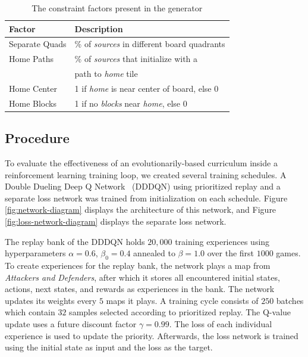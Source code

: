 \documentclass[letterpaper]{article} %
\begin{document}
\begin{table}[tpb]
\begin{tabular}{|l|l|}
\hline
\textbf{Factor} & \textbf{Description}                                       \\ \hline
Separate Quads  & \% of \textit{sources} in different board quadrants               \\ \hline
Home Paths      & \% of \textit{sources} that initialize with a\\ & path to \textit{home} tile          \\ \hline
Home Center     & 1 if \textit{home} is near center of board, else 0                  \\ \hline
Home Blocks     & 1 if no \textit{blocks} near \textit{home}, else 0 \\ \hline
\end{tabular}
\caption{The constraint factors present in the generator}
\label{table:constraint-factors}
\end{table}

\subsection{Procedure}\label{sec:case-procedure}
To evaluate the effectiveness of an evolutionarily-based curriculum inside a reinforcement learning training loop, we created several training schedules. A Double Dueling Deep Q Network~\cite{wang2016dueling} (DDDQN) using prioritized replay and a separate loss network was trained from initialization on each schedule. Figure \ref{fig:network-diagram} displays the architecture of this network, and Figure \ref{fig:loss-network-diagram} displays the separate loss network.

The replay bank of the DDDQN holds $20,000$ training experiences using hyperparameters $\alpha=0.6$, $\beta_{0}=0.4$ annealed to $\beta=1.0$ over the first $1000$ games. To create experiences for the replay bank, the network plays a map from \emph{Attackers and Defenders}, after which it stores all encountered initial states, actions, next states, and rewards as experiences in the bank. The network updates its weights every $5$ maps it plays. A training cycle consists of $250$ batches which contain $32$ samples selected according to prioritized replay. The Q-value update uses a future discount factor $\gamma=0.99$. The loss of each individual experience is used to update the priority. Afterwards, the loss network is trained using the initial state as input and the loss as the target.
\end{document}
